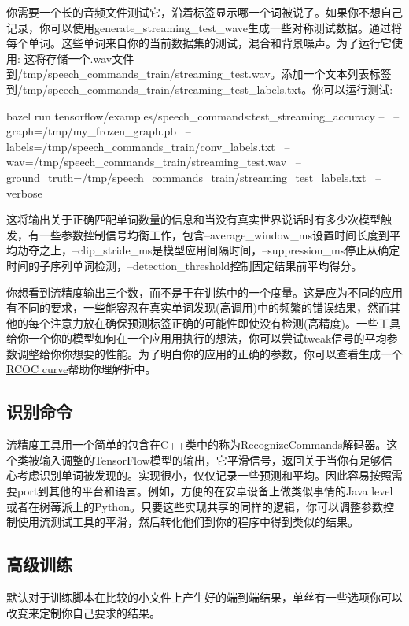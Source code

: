 {你需要一个长的音频文件测试它，沿着标签显示哪一个词被说了。如果你不想自己记录，你可以使用generate\_streaming\_test\_wave生成一些对称测试数据。通过将每个单词。这些单词来自你的当前数据集的测试，混合和背景噪声。为了运行它使用:\newline 
{}\newline
这将存储一个.wav文件到/tmp/speech\_commands\_train/streaming\_test.wav。添加一个文本列表标签到/tmp/speech\_commands\_train/streaming\_test\_labels.txt。你可以运行测试:
\begin{bashcode}
bazel run tensorflow/examples/speech_commands:test_streaming_accuracy -- \
--graph=/tmp/my_frozen_graph.pb \
--labels=/tmp/speech_commands_train/conv_labels.txt \
--wav=/tmp/speech_commands_train/streaming_test.wav \
--ground_truth=/tmp/speech_commands_train/streaming_test_labels.txt \
--verbose
\end{bashcode}
这将输出关于正确匹配单词数量的信息和当没有真实世界说话时有多少次模型触发，有一些参数控制信号均衡工作，包含--average\_window\_ms设置时间长度到平均劫夺之上，--clip\_stride\_ms是模型应用间隔时间，--suppression\_ms停止从确定时间的子序列单词检测，--detection\_threshold控制固定结果前平均得分。

你想看到流精度输出三个数，而不是于在训练中的一个度量。这是应为不同的应用有不同的要求，一些能容忍在真实单词发现(高调用)中的频繁的错误结果，然而其他的每个注意力放在确保预测标签正确的可能性即使没有检测(高精度)。一些工具给你一个你的模型如何在一个应用用执行的想法，你可以尝试tweak信号的平均参数调整给你你想要的性能。为了明白你的应用的正确的参数，你可以查看生成一个\href{https://en.wikipedia.org/wiki/Receiver_operating_characteristic}{RCOC curve}帮助你理解折中。
\subsection{识别命令}
流精度工具用一个简单的包含在C++类中的称为\href{https://github.com/tensorflow/tensorflow/tree/master/tensorflow/examples/speech_commands/recognize_commands.h}{RecognizeCommands}解码器。这个类被输入调整的TensorFlow模型的输出，它平滑信号，返回关于当你有足够信心考虑识别单词被发现的。实现很小，仅仅记录一些预测和平均。因此容易按照需要port到其他的平台和语言。例如，方便的在安卓设备上做类似事情的Java level或者在树莓派上的Python。只要这些实现共享的同样的逻辑，你可以调整参数控制使用流测试工具的平滑，然后转化他们到你的程序中得到类似的结果。
\subsection{高级训练}
默认对于训练脚本在比较的小文件上产生好的端到端结果，单丝有一些选项你可以改变来定制你自己要求的结果。
}
